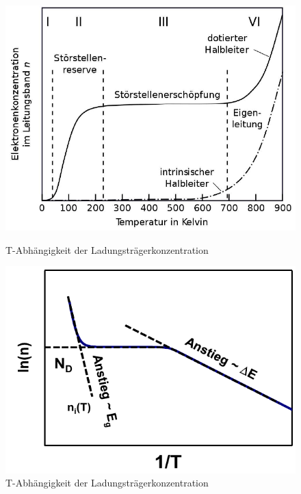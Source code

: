 		\begin{figure}[h!]
			\centering
			\begin{minipage}[t]{0.35\linewidth}
				\centering
				\includegraphics[width=\textwidth]{Kapitel/Kap02/tempAbh2.PNG}
				\caption{T-Abhängigkeit der Ladungsträgerkonzentration}
				\label{02_tempAbh3}
			\end{minipage}%
			\hfill
			\begin{minipage}[t]{0.35\linewidth}
				\centering
				\includegraphics[width=\textwidth]{Kapitel/Kap02/tempAbh3.PNG}
				\caption{T-Abhängigkeit der Ladungsträgerkonzentration}
				\label{02_tempAbh4}
			\end{minipage}
		\end{figure}
		
